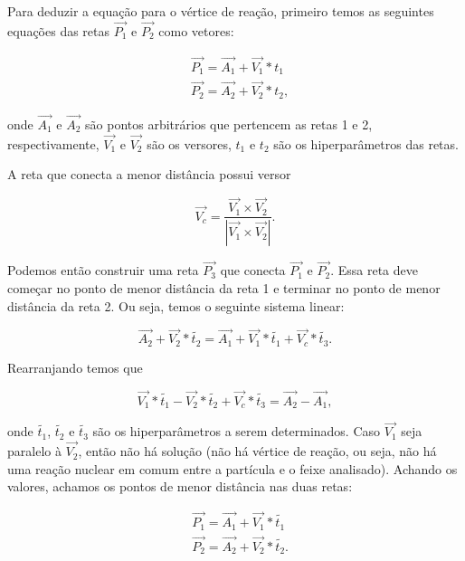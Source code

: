 \documentclass[a4paper,12pt,oneside]{book}
\begin{document}
\par Para deduzir a equação para o vértice de reação, primeiro temos as seguintes equações das retas $\vec{P_1}$ e $\vec{P_2}$ como vetores:

\begin{equation}
\begin{split}
        &\vec{P_1} = \vec{A_1} + \vec{V_1} * t_1 \\
        &\vec{P_2} = \vec{A_2} + \vec{V_2} * t_2,
\end{split}
\end{equation}

onde $\vec{A_1}$ e $\vec{A_2}$ são pontos arbitrários que pertencem as retas 1 e 2, respectivamente, $\vec{V_1}$ e $\vec{V_2}$ são os versores, $t_1$ e  $t_2$ são os hiperparâmetros das retas.

\par A reta que conecta a menor distância possui versor

\begin{equation}\label{eq:versor_menor_dist}
    \vec{V_c} = \frac{\vec{V_1} \times \vec{V_2}}{\left | \vec{V_1} \times \vec{V_2} \right |}.
\end{equation}

Podemos então construir uma reta $\vec{P_3}$ que conecta $\vec{P_1}$ e $\vec{P_2}$. Essa reta deve começar no ponto de menor distância da reta 1 e terminar no ponto de menor distância da reta 2. Ou seja, temos o seguinte sistema linear:

\begin{equation*}
    \vec{A_2} + \vec{V_2} * \tilde{t_2} = \vec{A_1} + \vec{V_1} * \tilde{t_1} + \vec{V_c} * \tilde{t_3}.
\end{equation*}

Rearranjando temos que

\begin{equation}\label{eq:sistema_vertice}
    \vec{V_1} * \tilde{t_1} - \vec{V_2} * \tilde{t_2} + \vec{V_c} * \tilde{t_3} = \vec{A_2} - \vec{A_1},
\end{equation}

onde $\tilde{t_1}$, $\tilde{t_2}$ e $\tilde{t_3}$ são os hiperparâmetros a serem determinados. Caso $\vec{V_1}$ seja paralelo à $\vec{V_2}$, então não há solução (não há vértice de reação, ou seja, não há uma reação nuclear em comum entre a partícula e o feixe analisado). Achando os valores, achamos os pontos de menor distância nas duas retas:

\begin{equation}
\begin{split}
        &\vec{P_1} = \vec{A_1} + \vec{V_1} * \tilde{t_1} \\
        &\vec{P_2} = \vec{A_2} + \vec{V_2} * \tilde{t_2}.
\end{split}
\end{equation}
\end{document}
